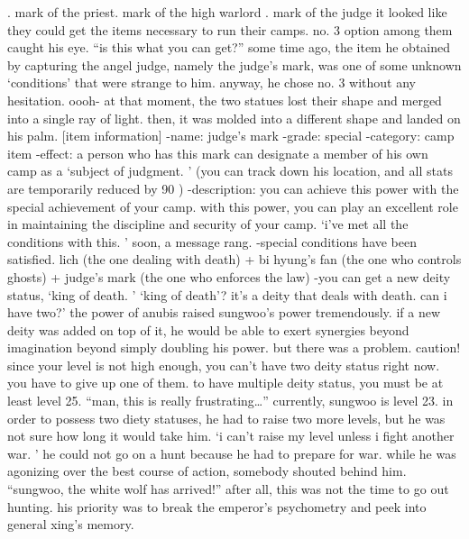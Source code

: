 .
 mark of the priest.
 mark of the high warlord
.
 mark of the judge it looked like they could get the items necessary to run their camps.
 no.
 3 option among them caught his eye.
 “is this what you can get?” some time ago, the item he obtained by capturing the angel judge, namely the judge’s mark, was one of some unknown ‘conditions’ that were strange to him.
 anyway, he chose no.
 3 without any hesitation.
 oooh- at that moment, the two statues lost their shape and merged into a single ray of light.
 then, it was molded into a different shape and landed on his palm.
 [item information] -name: judge’s mark -grade: special -category: camp item -effect: a person who has this mark can designate a member of his own camp as a ‘subject of judgment.
’ (you can track down his location, and all stats are temporarily reduced by 90%
) -description: you can achieve this power with the special achievement of your camp.
 with this power, you can play an excellent role in maintaining the discipline and security of your camp.
 ‘i’ve met all the conditions with this.
’ soon, a message rang.
 -special conditions have been satisfied.
lich (the one dealing with death) + bi hyung’s fan (the one who controls ghosts) + judge’s mark (the one who enforces the law) -you can get a new deity status, ‘king of death.
’ ‘king of death’? it’s a deity that deals with death.
 can i have two?’ the power of anubis raised sungwoo’s power tremendously.
 if a new deity was added on top of it, he would be able to exert synergies beyond imagination beyond simply doubling his power.
 but there was a problem.
caution! since your level is not high enough, you can’t have two deity status right now.
 you have to give up one of them.
to have multiple deity status, you must be at least level 25.
 “man, this is really frustrating…” currently, sungwoo is level 23.
 in order to possess two diety statuses, he had to raise two more levels, but he was not sure how long it would take him.
 ‘i can’t raise my level unless i fight another war.
’ he could not go on a hunt because he had to prepare for war.
 while he was agonizing over the best course of action, somebody shouted behind him.
 “sungwoo, the white wolf has arrived!” after all, this was not the time to go out hunting.
 his priority was to break the emperor’s psychometry and peek into general xing’s memory.


